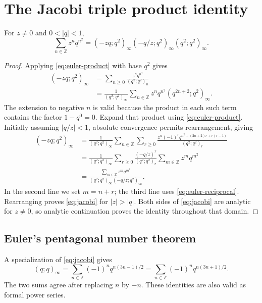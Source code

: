 \section{The Jacobi triple product identity}
\begin{theorem}\label{thm:jacobi}
For $z\ne0$ and $0<|q|<1$,
\begin{equation}\label{eq:jacobi}
 \sum_{n\in\mathbb Z}z^nq^{n^2}
 =(-zq;q^2)_\infty(-q/z;q^2)_\infty(q^2;q^2)_\infty.
\end{equation}
\end{theorem}
\begin{proof}
Applying \eqref{eq:euler-product} with base $q^2$ gives
\begin{align*}
 (-zq;q^2)_\infty
 &=\sum_{n\ge0}\frac{z^nq^{n^2}}{(q^2;q^2)_n}\\
 &=\frac1{(q^2;q^2)_\infty}
   \sum_{n\in\mathbb Z}z^nq^{n^2}(q^{2n+2};q^2)_\infty.
\end{align*}
The extension to negative $n$ is valid because the product in each such
term contains the factor $1-q^0=0$.
Expand that product using \eqref{eq:euler-product}. Initially assuming
$|q/z|<1$, absolute convergence permits rearrangement, giving
\begin{align*}
 (-zq;q^2)_\infty
 &=\frac1{(q^2;q^2)_\infty}
   \sum_{n\in\mathbb Z}\sum_{r\ge0}
   \frac{z^n(-1)^rq^{n^2+(2n+2)r+r(r-1)}}{(q^2;q^2)_r}\\
 &=\frac1{(q^2;q^2)_\infty}
   \sum_{r\ge0}\frac{(-q/z)^r}{(q^2;q^2)_r}
   \sum_{m\in\mathbb Z}z^mq^{m^2}\\
 &=\frac{\sum_{m\in\mathbb Z}z^mq^{m^2}}
   {(q^2;q^2)_\infty(-q/z;q^2)_\infty}.
\end{align*}
In the second line we set $m=n+r$; the third line uses
\eqref{eq:euler-reciprocal}. Rearranging proves \eqref{eq:jacobi} for
$|z|>|q|$. Both sides of \eqref{eq:jacobi} are analytic for $z\ne0$,
so analytic continuation proves the identity throughout that domain.
\end{proof}

\subsection{Euler's pentagonal number theorem}
A specialization of \eqref{eq:jacobi} gives
\begin{equation}\label{eq:pentagonal}
 (q;q)_\infty
 =\sum_{n\in\mathbb Z}(-1)^nq^{n(3n-1)/2}
 =\sum_{n\in\mathbb Z}(-1)^nq^{n(3n+1)/2}.
\end{equation}
The two sums agree after replacing $n$ by $-n$. These identities are also
valid as formal power series.
